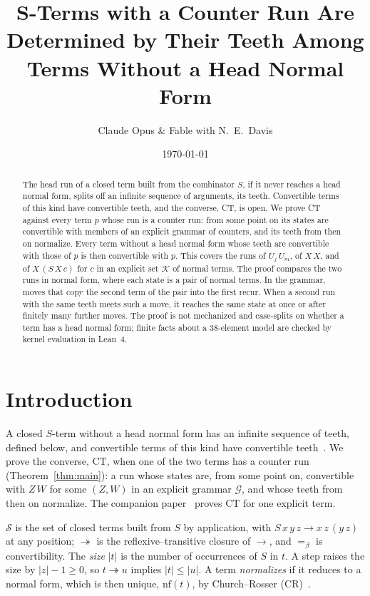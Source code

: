 \documentclass[11pt]{amsart}
\title[$S$-Terms with a Counter Run]{$\bm{S}$-Terms with a Counter Run Are Determined by Their Teeth Among Terms Without a Head Normal Form}
\author{Claude Opus \& Fable with N.\ E.\ Davis}
\date{\today}
\theoremstyle{definition}
\newcommand{\Ter}{\mathcal S}
\newcommand{\red}{\twoheadrightarrow}
\newcommand{\conv}{=_\beta}
\newcommand{\sz}[1]{\lvert#1\rvert}
\newcommand{\nf}{\mathrm{nf}}
\newcommand{\Gc}{\mathcal G}
\newcommand{\Kc}{\mathcal K}
\begin{document}
\begin{abstract}
The head run of a closed term built from the combinator $S$, if it never reaches a head normal
form, splits off an infinite sequence of arguments, its teeth. Convertible terms of this kind have
convertible teeth, and the converse, CT, is open. We prove CT against every term $p$ whose run is
a counter run: from some point on its states are convertible with members of an explicit grammar
of counters, and its teeth from then on normalize. Every term without a head normal form whose teeth are
convertible with those of $p$ is then convertible with $p$. This covers the runs of $U_j\,U_m$, of
$X\,X$, and of $X\,(S\,X\,c)$ for $c$ in an explicit set $\Kc$ of normal terms. The proof compares
the two runs in normal form, where each state is a pair of normal terms. In the grammar, moves that
copy the second term of the pair into the first recur. When a second run with the same teeth meets such a move, it
reaches the same state at once or after finitely many further moves. The proof is not mechanized
and case-splits on whether a term has a head normal form; finite facts about a 38-element model are
checked by kernel evaluation in Lean~4.
\end{abstract}

\maketitle

\section{Introduction}

A closed $S$-term without a head normal form has an infinite sequence of teeth, defined below, and
convertible terms of this kind have convertible teeth~\citep[Lemma~5]{s11}. We prove the converse,
CT, when one of the two terms has a counter run (Theorem~\ref{thm:main}): a run whose states are,
from some point on, convertible with $Z\,W$ for some $(Z,W)$ in an explicit grammar $\Gc$, and whose teeth from
then on normalize. The companion paper~\citep{s11} proves CT for one explicit term.

$\Ter$ is the set of closed terms built from $S$ by application, with $S\,x\,y\,z\to x\,z\,(y\,z)$ at
any position; $\red$ is the reflexive--transitive closure of $\to$, and $\conv$ is convertibility.
The \emph{size} $\sz t$ is the number of occurrences of $S$ in $t$. A step raises the size by
$\sz z-1\ge0$, so $t\red u$ implies $\sz t\le\sz u$. A term \emph{normalizes} if it reduces to a
normal form, which is then unique, $\nf(t)$, by Church--Rosser (CR)~\citep{terese}.
\end{document}
